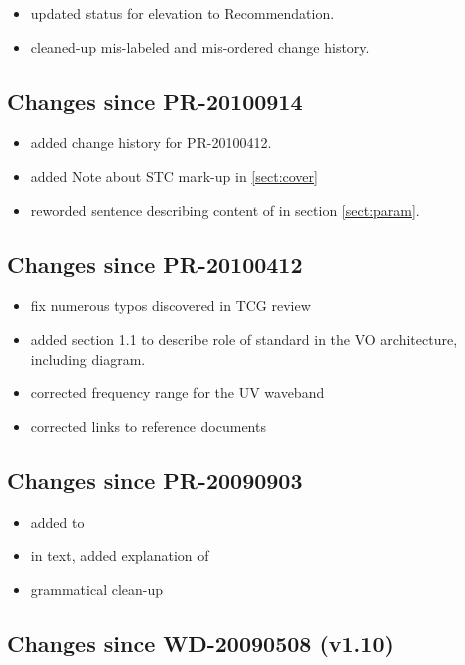 \documentclass[11pt,a4paper]{ivoa}
\begin{document}
\begin{itemize}
  \item updated status for elevation to Recommendation.
  \item cleaned-up mis-labeled and mis-ordered change history.
\end{itemize}

\subsection{Changes since PR-20100914}

\begin{itemize}
  \item added change history for PR-20100412.
  \item added Note about STC mark-up in \ref{sect:cover}
  \item reworded sentence describing content of  in
       section \ref{sect:param}.
\end{itemize}

\subsection{Changes since PR-20100412}

\begin{itemize}
  \item fix numerous typos discovered in TCG review
  \item added section 1.1 to describe role of standard in the VO
       architecture, including diagram.
  \item corrected frequency range for the UV waveband
  \item corrected links to reference documents
\end{itemize}

\subsection{Changes since PR-20090903}

\begin{itemize}
  \item added 
       to 
  \item in text, added explanation of
  \item grammatical clean-up
\end{itemize}

\subsection{Changes since WD-20090508 (v1.10)}
\end{document}
